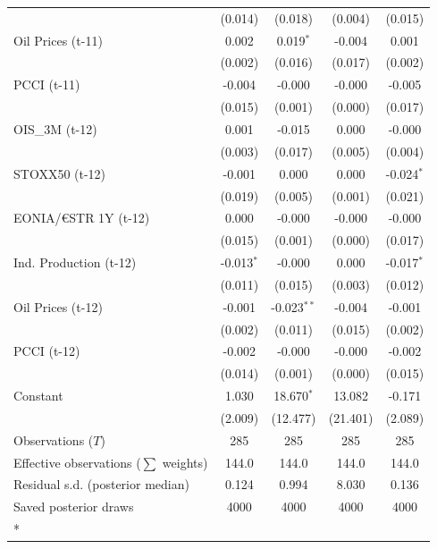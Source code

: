 \begin{longtable}[t]{lcccc}
 & (0.014) & (0.018) & (0.004) & (0.015)\\
Oil Prices (t-11) & 0.002 & 0.019$^{*}$ & -0.004 & 0.001\\
 & (0.002) & (0.016) & (0.017) & (0.002)\\
PCCI (t-11) & -0.004 & -0.000 & -0.000 & -0.005\\
 & (0.015) & (0.001) & (0.000) & \vphantom{1} (0.017)\\
OIS\_3M (t-12) & 0.001 & -0.015 & 0.000 & -0.000\\
 & (0.003) & (0.017) & (0.005) & (0.004)\\
STOXX50 (t-12) & -0.001 & 0.000 & 0.000 & -0.024$^{*}$\\
 & (0.019) & (0.005) & (0.001) & (0.021)\\
EONIA/€STR 1Y (t-12) & 0.000 & -0.000 & -0.000 & -0.000\\
 & (0.015) & (0.001) & (0.000) & (0.017)\\
Ind. Production (t-12) & -0.013$^{*}$ & -0.000 & 0.000 & -0.017$^{*}$\\
 & (0.011) & (0.015) & (0.003) & (0.012)\\
Oil Prices (t-12) & -0.001 & -0.023$^{**}$ & -0.004 & -0.001\\
 & (0.002) & (0.011) & (0.015) & (0.002)\\
PCCI (t-12) & -0.002 & -0.000 & -0.000 & -0.002\\
 & (0.014) & (0.001) & (0.000) & (0.015)\\
Constant & 1.030 & 18.670$^{*}$ & 13.082 & -0.171\\
 & (2.009) & (12.477) & (21.401) & (2.089)\\
\midrule
Observations ($T$) & 285 & 285 & 285 & 285\\
Effective observations ($\sum$ weights) & 144.0 & 144.0 & 144.0 & 144.0\\
Residual s.d. (posterior median) & 0.124 & 0.994 & 8.030 & 0.136\\
Saved posterior draws & 4000 & 4000 & 4000 & 4000\\*
\end{longtable}
\endgroup{}

